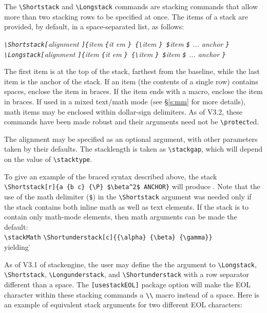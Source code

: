\documentclass{article}
\def\ste{\textsf{stackengine}}
\let\vb\verb
\begin{document}
The \vb|\Shortstack| and \vb|\Longstack| commands are stacking commands
that allow more than two stacking rows to be specified at once.  The
items of a stack are provided, by default, in a space-separated list, as
follows:

\itshape
\vb|\Shortstack[|alignment%
  \vb|]{|item %
  \vb|{|it em%
  \vb|} {\|item%
  \vb|} $|item%
  \vb|$| ... anchor%
  \vb|}|\\
\vb|\Longstack[|alignment%
  \vb|]{|item %
  \vb|{|it em%
  \vb|} {\|item%
  \vb|} $|item%
  \vb|$| ... anchor%
  \vb|}|
\upshape

The first item is at the top of the stack, farthest from the baseline,
while the last item is the anchor of the stack.  If an item (the
contents of a single row) contains spaces, enclose the item in braces.
If the item ends with a macro, enclose the item in braces. 
If used in a mixed text/math mode (see \S\ref{s:mm} for more
details), math items may be enclosed within dollar-sign delimiters.  As of 
V3.2, these commands have been made robust and their arguments need
not be \verb|\protect|ed.

The alignment may be specified as an optional argument, with other
parameters taken by their defaults.  The stacklength is taken as
\vb|\stackgap|, which will depend on the value of \vb|\stacktype|.

To give an example of the braced syntax described above,
the stack\\
\vb|\Shortstack[r]{a {b c} {\P} $\beta^2$ ANCHOR}|
will produce
.  Note that the use of the
math delimiter (\vb|$|) in the \vb|\Shortstack| argument was needed
only if the stack contains both inline math as well as text elements.
If the stack is to contain only math-mode elements, then math arguments
can be made the default:\\
\vb|\stackMath|%
\vb|\Shortunderstack[c]{{\alpha} {\beta} {\gamma}}|\\
yielding
\stackMath
\Shortunderstack[c]{{\alpha} {\beta} {\gamma}}\.
\stackText

As of V3.1 of \ste, the user may define the the argument to 
\vb|\Longstack|, \vb|\Shortstack|, \vb|\Longunderstack|, and
\vb|\Shortunderstack| with a row separator different than a space.
The \vb|[usestackEOL]| package option will make the EOL character within
these stacking commands a \vb|\\| macro instead of a space.  Here
is an example of equivalent stack arguments for two different EOL
characters:
\end{document}
